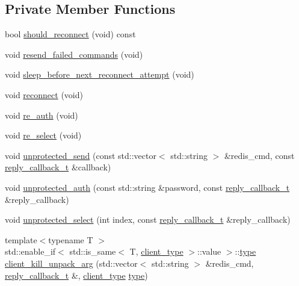 \subsection*{Private Member Functions}
\begin{DoxyCompactItemize}
\item 
bool \hyperlink{classcpp__redis_1_1client_a62dc004b1d1e73787b8b211ecc8f77bb}{should\+\_\+reconnect} (void) const
\item 
void \hyperlink{classcpp__redis_1_1client_a6cf006e4c6e69a00b63cc7e1281d326b}{resend\+\_\+failed\+\_\+commands} (void)
\item 
void \hyperlink{classcpp__redis_1_1client_ae615fdb05872724b2f8337f6cdeb1889}{sleep\+\_\+before\+\_\+next\+\_\+reconnect\+\_\+attempt} (void)
\item 
void \hyperlink{classcpp__redis_1_1client_aa27639ab1fea971f50664cbb20918b34}{reconnect} (void)
\item 
void \hyperlink{classcpp__redis_1_1client_a89c93f201d057dfa2eb8c7b80ff4f5c9}{re\+\_\+auth} (void)
\item 
void \hyperlink{classcpp__redis_1_1client_abc1daa18274ff5994c88600a2c2f3c67}{re\+\_\+select} (void)
\item 
void \hyperlink{classcpp__redis_1_1client_a89e9857149094a693abb2e4015779231}{unprotected\+\_\+send} (const std\+::vector$<$ std\+::string $>$ \&redis\+\_\+cmd, const \hyperlink{classcpp__redis_1_1client_a061a1140d36d2eaeda82b09a0bb3f9f2}{reply\+\_\+callback\+\_\+t} \&callback)
\item 
void \hyperlink{classcpp__redis_1_1client_a0bb20d17620ff63219f7e932d3baa0c6}{unprotected\+\_\+auth} (const std\+::string \&password, const \hyperlink{classcpp__redis_1_1client_a061a1140d36d2eaeda82b09a0bb3f9f2}{reply\+\_\+callback\+\_\+t} \&reply\+\_\+callback)
\item 
void \hyperlink{classcpp__redis_1_1client_ae2ac4b582d4d656b3c76450ea88c7b58}{unprotected\+\_\+select} (int index, const \hyperlink{classcpp__redis_1_1client_a061a1140d36d2eaeda82b09a0bb3f9f2}{reply\+\_\+callback\+\_\+t} \&reply\+\_\+callback)
\item 
{\footnotesize template$<$typename T $>$ }\\std\+::enable\+\_\+if$<$ std\+::is\+\_\+same$<$ T, \hyperlink{classcpp__redis_1_1client_a388877b01b4e045cddb138e70a68e000}{client\+\_\+type} $>$\+::value $>$\+::\hyperlink{classcpp__redis_1_1client_ac284ea9a5c0e95d49a675403aaf4847c}{type} \hyperlink{classcpp__redis_1_1client_a6a1bfc9e37967c4a602d917f87a5b929}{client\+\_\+kill\+\_\+unpack\+\_\+arg} (std\+::vector$<$ std\+::string $>$ \&redis\+\_\+cmd, \hyperlink{classcpp__redis_1_1client_a061a1140d36d2eaeda82b09a0bb3f9f2}{reply\+\_\+callback\+\_\+t} \&, \hyperlink{classcpp__redis_1_1client_a388877b01b4e045cddb138e70a68e000}{client\+\_\+type} \hyperlink{classcpp__redis_1_1client_ac284ea9a5c0e95d49a675403aaf4847c}{type})

\end{DoxyCompactItemize}
